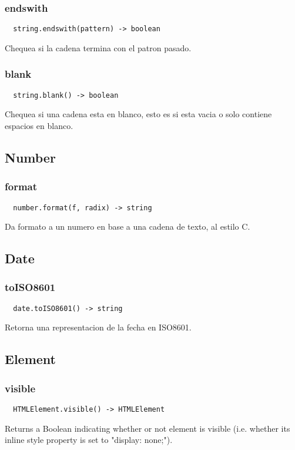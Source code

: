 \subsubsection*{endswith}
\begin{verbatim}
  string.endswith(pattern) -> boolean
\end{verbatim}
Chequea si la cadena termina con el patron pasado.

\subsubsection*{blank}
\begin{verbatim}
  string.blank() -> boolean
\end{verbatim}
Chequea si una cadena esta en blanco, esto es si esta vacia o solo contiene espacios en blanco.

\subsection{Number}
\subsubsection*{format}
\begin{verbatim}
  number.format(f, radix) -> string
\end{verbatim}
Da formato a un numero en base a una cadena de texto, al estilo C.

\subsection{Date}
\subsubsection*{toISO8601}
\begin{verbatim}
  date.toISO8601() -> string
\end{verbatim}
Retorna una representacion de la fecha en ISO8601.

\subsection{Element}
\subsubsection*{visible}
\begin{verbatim}
  HTMLElement.visible() -> HTMLElement
\end{verbatim}
Returns a Boolean indicating whether or not element is visible (i.e. whether its inline style property is set to "display: none;").

